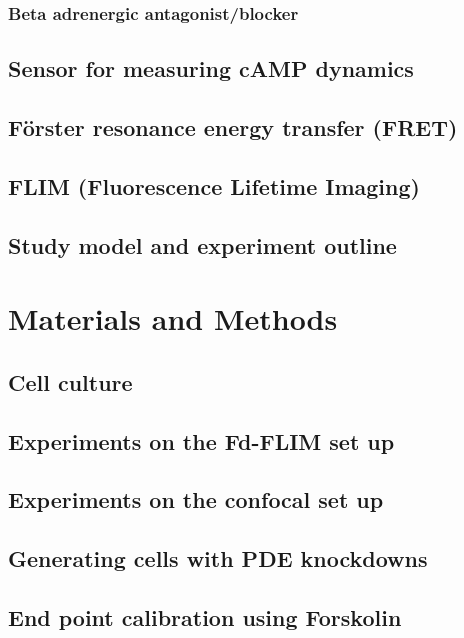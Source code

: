 \documentclass[a4paper,11pt,oneside]{book}
\begin{document}
\subsection{Beta adrenergic antagonist/blocker}


\section{Sensor for measuring cAMP dynamics }


\section{Förster resonance energy transfer (FRET) }


\section{FLIM (Fluorescence Lifetime Imaging)}


\section{Study model and experiment outline}


\newpage
\chapter{Materials and Methods}
\section{Cell culture}


\section{Experiments on the Fd-FLIM set up}


\section{Experiments on the confocal set up}


\section{Generating cells with PDE knockdowns}


\section{End point calibration using Forskolin }
\end{document}
